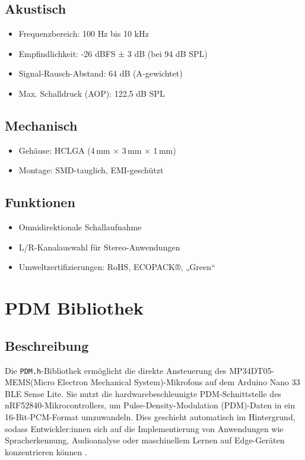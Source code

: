 \subsection{Akustisch}
\begin{itemize}
	\item Frequenzbereich: 100 Hz bis 10 kHz
	\item Empfindlichkeit: -26 dBFS ± 3 dB (bei 94 dB SPL)
	\item Signal-Rausch-Abstand: 64 dB (A-gewichtet)
	\item Max. Schalldruck (AOP): 122,5 dB SPL
\end{itemize}

\subsection{Mechanisch}
\begin{itemize}
	\item Gehäuse: HCLGA (4\,mm × 3\,mm × 1\,mm)
	\item Montage: SMD-tauglich, EMI-geschützt
\end{itemize}

\subsection{Funktionen}
\begin{itemize}
	\item Omnidirektionale Schallaufnahme
	\item L/R-Kanalauswahl für Stereo-Anwendungen
	\item Umweltzertifizierungen: RoHS, ECOPACK®, „Green“
\end{itemize}

\cite{STMicroelectronics:2021b}

\section{PDM Bibliothek} \label{sec:PDM.h}

\subsection{Beschreibung}

Die \texttt{PDM.h}-Bibliothek ermöglicht die direkte Ansteuerung des MP34DT05-MEMS(Micro Electron Mechanical System)-Mikrofons auf dem Arduino Nano 33 BLE Sense Lite. Sie nutzt die hardwarebeschleunigte PDM-Schnittstelle des nRF52840-Mikrocontrollers, um Pulse-Density-Modulation (PDM)-Daten in ein 16-Bit-PCM-Format umzuwandeln. Dies geschieht automatisch im Hintergrund, sodass Entwickler:innen sich auf die Implementierung von Anwendungen wie Spracherkennung, Audioanalyse oder maschinellem Lernen auf Edge-Geräten konzentrieren können \cite{ArduinoPDM:2023}.

